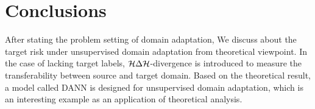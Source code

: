 \section{Conclusions}
After stating the problem setting of domain adaptation, We discuss about the target risk under unsupervised domain adaptation from theoretical viewpoint.
In the case of lacking target labels, $\mathcal{H} \Delta \mathcal{H}$-divergence is introduced to  measure the transferability between source and target domain.
Based on the theoretical result, a model called DANN is designed for unsupervised domain adaptation, which is an interesting example as an application of theoretical analysis.
